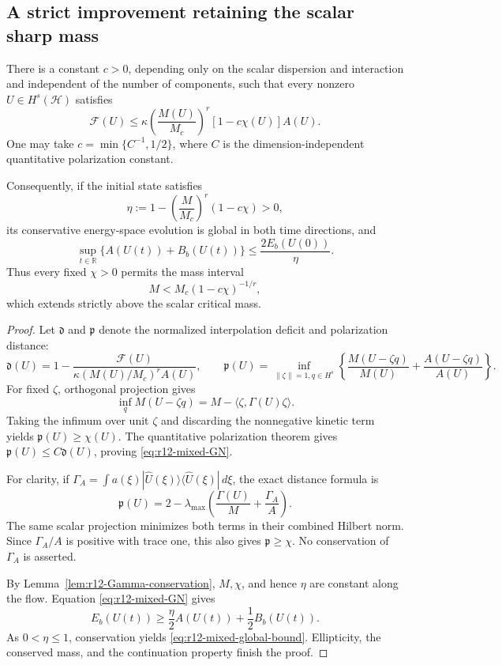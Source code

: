 \subsection{A strict improvement retaining the scalar sharp mass}
\begin{theorem}
\label{thm:r12-mixed-threshold}
There is a constant $c>0$, depending only on the scalar dispersion
and interaction and independent of the number of components, such that
every nonzero $U\in H^s(\mathcal H)$ satisfies
\begin{equation}\label{eq:r12-mixed-GN}
 \mathcal F(U)
 \le \kappa\left(\frac{M(U)}{M_c}\right)^r
        [1-c\chi(U)]A(U).
\end{equation}
One may take $c=\min\{C^{-1},1/2\}$, where $C$ is the
dimension-independent quantitative polarization constant.

Consequently, if the initial state satisfies
\begin{equation}\label{eq:r12-mixed-positive}
 \eta:=1-\left(\frac{M}{M_c}\right)^r(1-c\chi)>0,
\end{equation}
its conservative energy-space evolution is global in both time
directions, and
\begin{equation}\label{eq:r12-mixed-global-bound}
 \sup_{t\in\mathbb R}\{A(U(t))+B_b(U(t))\}
 \le\frac{2E_b(U(0))}{\eta}.
\end{equation}
Thus every fixed $\chi>0$ permits the mass interval
\[
 M<M_c(1-c\chi)^{-1/r},
\]
which extends strictly above the scalar critical mass.
\end{theorem}
\begin{proof}
Let $\mathfrak d$ and $\mathfrak p$ denote the normalized
interpolation deficit and polarization distance:
\[
 \mathfrak d(U)=1-
 \frac{\mathcal F(U)}{\kappa(M(U)/M_c)^r A(U)},
 \qquad
 \mathfrak p(U)=\inf_{\|\zeta\|=1,q\in H^s}
 \left\{\frac{M(U-\zeta q)}{M(U)}
              +\frac{A(U-\zeta q)}{A(U)}\right\}.
\]
For fixed $\zeta$, orthogonal projection gives
\[
 \inf_q M(U-\zeta q)=M-\langle\zeta,\Gamma(U)\zeta\rangle.
\]
Taking the infimum over unit $\zeta$ and discarding the nonnegative
kinetic term yields $\mathfrak p(U)\ge\chi(U)$.
The quantitative polarization theorem gives
$\mathfrak p(U)\le C\mathfrak d(U)$, proving
\eqref{eq:r12-mixed-GN}.

For clarity, if
$\Gamma_A=\int a(\xi)|\widehat U(\xi)\rangle
\langle\widehat U(\xi)|\,d\xi$, the exact distance formula is
\[
 \mathfrak p(U)=2-\lambda_{\max}
       \left(\frac{\Gamma(U)}M+\frac{\Gamma_A}A\right).
\]
The same scalar projection minimizes both terms in their combined
Hilbert norm. Since $\Gamma_A/A$ is positive with trace one, this
also gives $\mathfrak p\ge\chi$. No conservation of $\Gamma_A$ is
asserted.

By Lemma~\ref{lem:r12-Gamma-conservation}, $M,\chi$, and hence
$\eta$ are constant along the flow. Equation
\eqref{eq:r12-mixed-GN} gives
\[
 E_b(U(t))\ge\frac\eta2A(U(t))+\frac12B_b(U(t)).
\]
As $0<\eta\le1$, conservation yields
\eqref{eq:r12-mixed-global-bound}. Ellipticity, the conserved mass,
and the continuation property finish the proof.
\end{proof}

